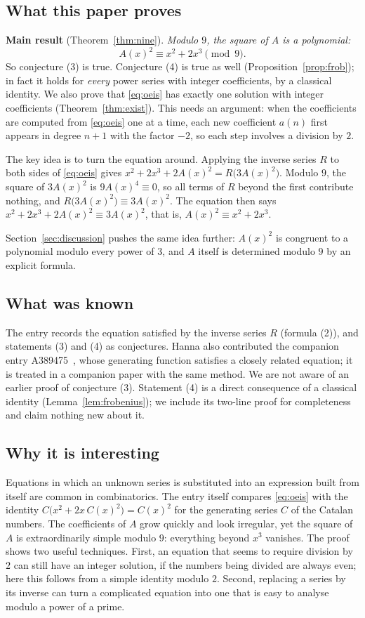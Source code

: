 \documentclass[11pt,a4paper]{article}
\theoremstyle{definition}
\theoremstyle{remark}
\begin{document}
\subsection{What this paper proves}
\textbf{Main result} (Theorem~\ref{thm:nine}). \emph{Modulo $9$, the square of $A$ is a polynomial:}
\[
A(x)^2\equiv x^2+2x^3\pmod 9 .
\]
So conjecture (3) is true. Conjecture (4) is true as well (Proposition~\ref{prop:frob}); in fact it holds for
\emph{every} power series with integer coefficients, by a classical identity. We also prove that \eqref{eq:oeis} has
exactly one solution with integer coefficients (Theorem~\ref{thm:exist}). This needs an argument: when the coefficients
are computed from \eqref{eq:oeis} one at a time, each new coefficient $a(n)$ first appears in degree $n+1$ with the
factor $-2$, so each step involves a division by $2$.

The key idea is to turn the equation around. Applying the inverse series $R$ to both sides of \eqref{eq:oeis} gives
$x^2+2x^3+2A(x)^2=R\bigl(3A(x)^2\bigr)$. Modulo $9$, the square of $3A(x)^2$ is $9A(x)^4\equiv0$, so all terms of $R$
beyond the first contribute nothing, and $R\bigl(3A(x)^2\bigr)\equiv3A(x)^2$. The equation then says
$x^2+2x^3+2A(x)^2\equiv3A(x)^2$, that is, $A(x)^2\equiv x^2+2x^3$.

Section~\ref{sec:discussion} pushes the same idea further: $A(x)^2$ is congruent to a polynomial modulo every power
of $3$, and $A$ itself is determined modulo $9$ by an explicit formula.

\subsection{What was known}
The entry records the equation satisfied by the inverse series $R$ (formula (2)), and statements (3) and (4) as
conjectures. Hanna also contributed the companion entry A389475~\cite{oeisother}, whose generating function satisfies a
closely related equation; it is treated in a companion paper with the same method. We are not aware of an earlier
proof of conjecture (3). Statement (4) is a direct consequence of a classical identity (Lemma~\ref{lem:frobenius});
we include its two-line proof for completeness and claim nothing new about it.

\subsection{Why it is interesting}
Equations in which an unknown series is substituted into an expression built from itself are common in
combinatorics. The entry itself compares \eqref{eq:oeis} with the identity $C\bigl(x^2+2x\,C(x)^2\bigr)=C(x)^2$ for the
generating series $C$ of the Catalan numbers. The coefficients of $A$ grow quickly and look irregular, yet the square
of $A$ is extraordinarily simple modulo $9$: everything beyond $x^3$ vanishes. The proof shows two useful techniques.
First, an equation that seems to require division by $2$ can still have an integer solution, if the numbers being
divided are always even; here this follows from a simple identity modulo $2$. Second, replacing a series by its inverse
can turn a complicated equation into one that is easy to analyse modulo a power of a prime.
\end{document}
